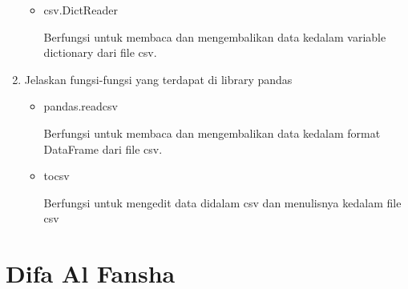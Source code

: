 \begin{enumerate}
\begin{itemize}
	\item csv.DictReader
	
	Berfungsi untuk membaca dan mengembalikan data kedalam variable dictionary dari file csv.
	
	
\end{itemize}

\item Jelaskan fungsi-fungsi yang terdapat di library pandas
\begin{itemize}
	\item pandas.read\textunderscore csv
	
	Berfungsi untuk membaca dan mengembalikan data kedalam format DataFrame dari file csv.
	
	
	\item to\textunderscore csv
	
	Berfungsi untuk mengedit data didalam csv dan menulisnya kedalam file csv
	
\end{itemize}
\end{enumerate}
\section{Difa Al Fansha}
